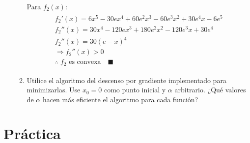 \documentclass[10pt,letterpaper]{article}
\begin{document}
\begin{enumerate}
\begin{enumerate}
                    \begin{figure}
                        \centering
                        \def\svgwidth{\columnwidth}
                        
                    \end{figure}

                    Para $f_2(x)$:
                    \begin{equation*} \begin{split} \begin{gathered}
                        f_2'(x) =  6 x^5  - 30 e x^4  + 60 e^2 x^3  - 60 e^3 x^2 + 30 e^4 x - 6 e^5  \\
                        f_2''(x) = 30 x^4 - 120 e x^3 + 180 e^2 x^2 - 120 e^3 x  + 30 e^4 \\
                        f_2''(x) = 30(e - x)^4 \\
                        \Rightarrow f_2''(x) > 0 \\
                        \therefore \; f_2 \text{ es convexa} \quad \blacksquare
                    \end{gathered} \end{split} \end{equation*}

                \item Utilice el algoritmo del descenso por gradiente implementado
                para minimizarlas. Use $x_0 = 0$ como punto inicial y $\alpha$
                arbitrario. ¿Qué valores de $\alpha$ hacen más eficiente el algoritmo
                para cada función?
            \end{enumerate}
    \end{enumerate}

\section{Práctica}
\end{document}
